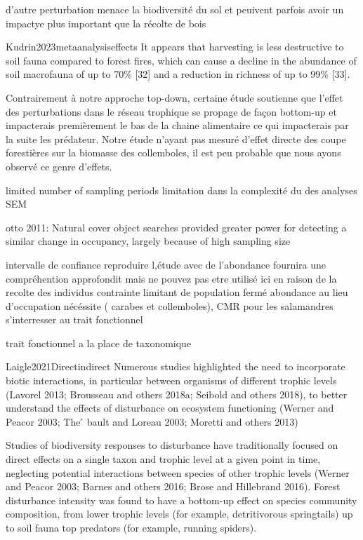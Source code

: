 
d'autre perturbation menace la biodiversité du sol et peuivent parfois avoir un impactye plus important que la récolte de bois

 Kudrin2023metaanalysiseffects
 It appears that harvesting is less destructive to soil fauna compared to forest fires, which can cause a decline in the abundance of soil macrofauna of up to 70\% [32] and a reduction in richness of up to 99\% [33].


Contrairement à notre approche top-down, certaine étude soutienne que l'effet des perturbations dans le réseau trophique se propage de façon bottom-up et impacterais premièrement le bas de la chaine alimentaire ce qui impacterais par la suite les prédateur.
Notre étude n'ayant pas mesuré d'effet directe des coupe forestières sur la biomasse des collemboles, il est peu probable que nous ayons observé ce genre d'effets. 

  limited number of sampling periods
  limitation dans la complexité du des analyses SEM

  otto 2011:
  Natural cover object searches provided greater power for detecting a similar change in occupancy, largely because of high sampling size

    intervalle de confiance
  reproduire l,étude avec de l'abondance fournira une compréhention approfondit mais ne pouvez pas etre utilisé ici en raison de la recolte des individus
  contrainte limitant de population fermé
  abondance au lieu d'occupation nécéssite ( carabes et collemboles), CMR pour les salamandres
  s'interresser au trait fonctionnel 

  trait fonctionnel a la place de taxonomique



Laigle2021Directindirect
Numerous studies highlighted the need to incorporate biotic interactions, in particular between organisms of different trophic levels (Lavorel 2013; Brousseau and others 2018a; Seibold and others 2018), to better understand the effects of disturbance on ecosystem functioning (Werner and Peacor 2003; The ́ bault and Loreau 2003; Moretti and others 2013)

Studies of biodiversity responses to disturbance have traditionally focused on direct effects on a single taxon and trophic level at a given point in time, neglecting potential interactions between species of other trophic levels (Werner and Peacor 2003; Barnes and others 2016; Brose and Hillebrand 2016).
Forest disturbance intensity was found to have a bottom-up effect on species community composition, from lower trophic levels (for example, detritivorous springtails) up to soil fauna top predators (for example, running spiders).


